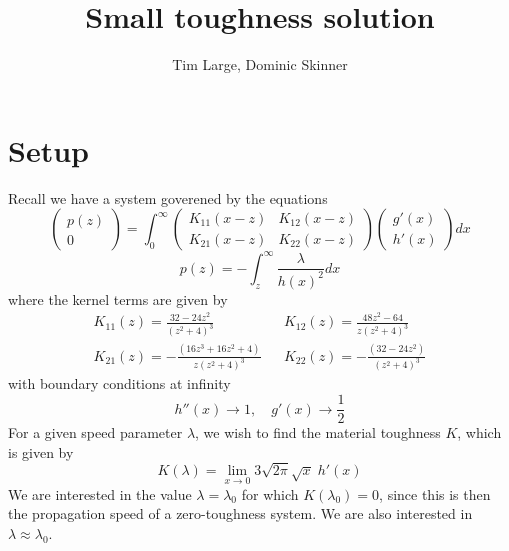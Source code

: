 \documentclass{article}
\begin{document}
\title{Small toughness solution}
\author{Tim Large, Dominic Skinner}
\maketitle
\section{Setup}
Recall we have a system goverened by the equations
\begin{equation} \left( \begin{array}{c} p(z) \\ 0 \end{array} \right) =
\int_0^{\infty} \left( \begin{array}{cc} K_{11}(x-z) & K_{12}(x-z) \\
 K_{21}(x-z) & K_{22}(x-z) \end{array} \right)
 \left( \begin{array}{c} g'(x) \\ h'(x) \end{array} \right) dx
\end{equation}
\begin{equation}
p(z) = - \int_z^{\infty} \frac{\lambda}{h(x)^2} dx
\end{equation}
where the kernel terms are given by
\[ \begin{array}{lcl}
\displaystyle K_{11}(z) = \frac{32-24z^2}{(z^2+4)^3} & &
\displaystyle K_{12}(z) = \frac{48z^2-64}{z(z^2+4)^3} \\[19pt]
\displaystyle K_{21}(z) = -\frac{(16z^3+16z^2+4)}{z(z^2+4)^3} & &
\displaystyle K_{22}(z) = -\frac{(32-24z^2)}{(z^2+4)^3} 
\end{array} \] 
with boundary conditions at infinity
\[ h''(x) \to 1, \quad g'(x) \to \frac{1}{2} \]
For a given speed parameter $\lambda$, we wish to find the material toughness
$K$, which is given by
\[ K(\lambda) = \lim_{x\to 0} 3 \sqrt{2\pi} \sqrt{x} \;h'(x) \]
We are interested in the value $\lambda = \lambda_0$ for which 
$K(\lambda_0)=0$, since this is then the propagation speed of a zero-toughness
system. We are also interested in $\lambda \approx \lambda_0$.
%
\end{document}
